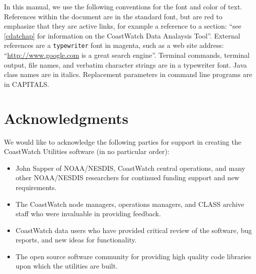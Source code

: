 In this manual, we use the following conventions for the font and
color of text.  References within the document are in the
standard font, but are red to emphasize that they are active
links, for example a reference to a section: ``see
\autoref{cdatchap} for information on the CoastWatch Data
Analaysis Tool''.  External references are a {\tt typewriter}
font in magenta, such as a web site address:
``\url{http://www.google.com} is a great search engine''.
Terminal commands, terminal output, file names, and verbatim
character strings are in a {\file typewriter} font.  Java class
names are in {\java italics}.  Replacement parameters in command
line programs are in CAPITALS.

\section*{Acknowledgments}

We would like to acknowledge the following parties for support in
creating the CoastWatch Utilities software (in no particular
order):
\begin{itemize}

  \item John Sapper of NOAA/NESDIS, CoastWatch central
  operations, and many other NOAA/NESDIS researchers for
  continued funding support and new requirements.

  \item The CoastWatch node managers, operations managers, and
  CLASS archive staff who were invaluable in providing feedback.

  \item CoastWatch data users who have provided critical review
  of the software, bug reports, and new ideas for functionality.

  \item The open source software community for providing high
  quality code libraries upon which the utilities are built.

\end{itemize}
